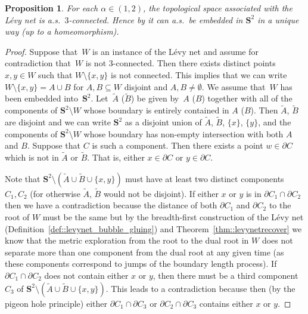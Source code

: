 \documentclass[JEP,XML,SOM,Unicode]{cedram}
\theoremstyle{plain}
\numberwithin{theorem}{section}
\newtheorem{proposition}[theorem]{Proposition}
\theoremstyle{definition}
\renewcommand{\S}{{\mathbf S}}
\let\wt\widetilde
\begin{document}
\begin{proposition}
\label{prop::levynet_three_connected}
For each $\alpha \in (1,2)$, the topological space associated with the Lévy net is a.s.\ $3$-connected. Hence by \cite{3connectedembeduniquely} it can a.s.\ be embedded in $\S^2$ in a unique way (up to a homeomorphism).
\end{proposition}
\begin{proof}
Suppose that~$W$ is an instance of the Lévy net and assume for contradiction that~$W$ is not $3$-connected. Then there exists distinct points $x,y \in W$ such that $W \setminus \{x,y\}$ is not connected. This implies that we can write $W \setminus \{x,y\} = A \cup B$ for $A,B \subseteq W$ disjoint and $A,B \neq \emptyset$. We assume that~$W$ has been embedded into~$\S^2$. Let~$\wt{A}$ (\resp $\wt{B}$) be given by~$A$ (\resp $B$) together with all of the components of $\S^2 \setminus W$ whose boundary is entirely contained in $A$ (\resp $B$). Then $\wt{A}$, $\wt{B}$ are disjoint and we can write $\S^2$ as a disjoint union of $\wt{A}$, $\wt{B}$, $\{x\}$, $\{y\}$, and the components of $\S^2 \setminus W$ whose boundary has non-empty intersection with both $A$ and $B$. Suppose that $C$ is such a component. Then there exists a point $w \in \partial C$ which is not in $\wt{A}$ or $\wt{B}$. That is, either $x \in \partial C$ or $y \in \partial C$.\enlargethispage{.5\baselineskip}%

Note that $\S^2 \setminus (\wt{A} \cup \wt{B} \cup \{x,y\})$ must have at least two distinct components $C_1,C_2$ (for otherwise $\wt{A}$, $\wt{B}$ would not be disjoint). If either $x$ or $y$ is in $\partial C_1 \cap \partial C_2$ then we have a contradiction because the distance of both $\partial C_1$ and $\partial C_2$ to the root of $W$ must be the same but by the breadth-first construction of the Lévy net (Definition~\ref{def::levynet_bubble_gluing}) and Theorem~\ref{thm::levynetrecover} we know that the metric exploration from the root to the dual root in $W$ does not separate more than one component from the dual root at any given time (as these components correspond to jumps of the boundary length process). If~$\partial C_1 \cap \partial C_2$ does not contain either $x$ or $y$, then there must be a third component $C_3$ of $\S^2 \setminus (\wt{A} \cup \wt{B} \cup \{x,y\})$. This leads to a contradiction because then (by the pigeon hole principle) either $\partial C_1 \cap \partial C_3$ or $\partial C_2 \cap \partial C_3$ contains either $x$ or $y$.
\end{proof}
\end{document}
